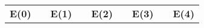 \documentclass[10pt]{report}
\begin{document}
\begin{tabular}{lllllllll}
	\cline{1-1} \cline{3-3} \cline{5-5} \cline{7-7} \cline{9-9}
	\multicolumn{1}{|c|}{\textbf{E(0)}}                                                                                                                   & \multicolumn{1}{c|}{\textbf{}} & \multicolumn{1}{c|}{\textbf{E(1)}}                                                                                                                       & \multicolumn{1}{c|}{}          & \multicolumn{1}{c|}{\textbf{E(2)}}                                                                                                      & \multicolumn{1}{l|}{} & \multicolumn{1}{c|}{\textbf{E(3)}}                                                                                                                                    & \multicolumn{1}{c|}{\textbf{}} & \multicolumn{1}{c|}{\textbf{E(4)}}                                                                                                                   \\ \cline{1-1} \cline{3-3} \cline{5-5} \cline{7-7} \cline{9-9} 

\end{tabular}
\end{document}

